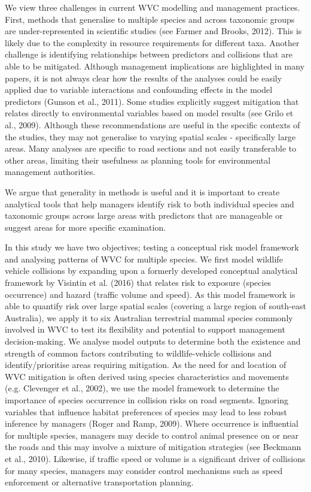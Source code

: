 We view three challenges in current WVC modelling and management practices.  First, methods that generalise to multiple species and across taxonomic groups are under-represented in scientific studies (see Farmer and Brooks, 2012).  This is likely due to the complexity in resource requirements for different taxa.  Another challenge is identifying relationships between predictors and collisions that are able to be mitigated.  Although management implications are highlighted in many papers, it is not always clear how the results of the analyses could be easily applied due to variable interactions and confounding effects in the model predictors (Gunson et al., 2011).  Some studies explicitly suggest mitigation that relates directly to environmental variables based on model results (see Grilo et al., 2009).  Although these recommendations are useful in the specific contexts of the studies, they may not generalise to varying spatial scales - specifically large areas.  Many analyses are specific to road sections and not easily transferable to other areas, limiting their usefulness as planning tools for environmental management authorities.

We argue that generality in methods is useful and it is important to create analytical tools that help managers identify risk to both individual species and taxonomic groups across large areas with predictors that are manageable or suggest areas for more specific examination.

In this study we have two objectives; testing a conceptual risk model framework and analysing patterns of WVC for multiple species.  We first model wildlife vehicle collisions by expanding upon a formerly developed conceptual analytical framework by Visintin et al. (2016) that relates risk to exposure (species occurrence) and hazard (traffic volume and speed).  As this model framework is able to quantify risk over large spatial scales (covering a large region of south-east Australia), we apply it to six Australian terrestrial mammal species commonly involved in WVC to test its flexibility and potential to support management decision-making.  We analyse model outputs to determine both the existence and strength of common factors contributing to wildlife-vehicle collisions and identify/prioritise areas requiring mitigation.  As the need for and location of WVC mitigation is often derived using species characteristics and movements (e.g. Clevenger et al., 2002), we use the model framework to determine the importance of species occurrence in collision risks on road segments.  Ignoring variables that influence habitat preferences of species may lead to less robust inference by managers (Roger and Ramp, 2009).  Where occurrence is influential for multiple species, managers may decide to control animal presence on or near the roads and this may involve a mixture of mitigation strategies (see Beckmann et al., 2010).  Likewise, if traffic speed or volume is a significant driver of collisions for many species, managers may consider control mechanisms such as speed enforcement or alternative transportation planning.

